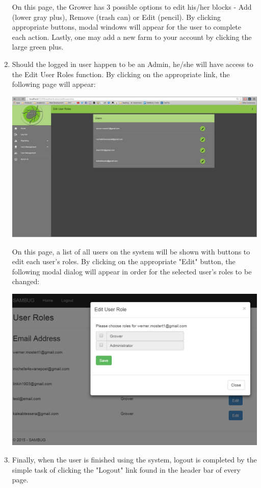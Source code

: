 \documentclass[11pt,a4paper,titlepage]{article}
\begin{document}
\begin{enumerate}
\begin{center}
	\end{center}
	On this page, the Grower has 3 possible options to edit his/her blocks - Add (lower gray plus), Remove (trash can) or Edit (pencil). By clicking appropriate buttons, modal windows will appear for the user to complete each action. Lastly, one may add a new farm to your account by clicking the large green plus.
	
\item Should the logged in user happen to be an Admin, he/she will have access to the Edit User Roles function. By clicking on the appropriate link, the following page will appear: 
	\begin{center}
		\includegraphics[width=\linewidth]{edituserroles.png}
	\end{center}
	On this page, a list of all users on the system will be shown with buttons to edit each user's roles. By clicking on the appropriate "Edit" button, the following modal dialog will appear in order for the selected user's roles to be changed:
		\begin{center}
			\includegraphics[scale=0.3]{edituserrole.png} %
		\end{center}
\item Finally, when the user is finished using the system, logout is completed by the simple task of clicking the "Logout" link found in the header bar of every page.
	\end{enumerate}
\end{document}
